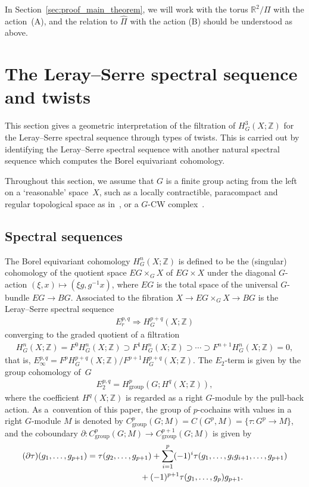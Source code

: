 \documentclass[pdftex]{sigma}
\theoremstyle{definition}
\newcommand{\R}{\mathbb{R}}
\newcommand{\Z}{\mathbb{Z}}
\begin{document}
In Section~\ref{sec:proof_main_theorem}, we will work with the torus $\R^2/\Pi$ with the action~(A), and the relation to $\hat{\Pi}$ with the action (B) should be understood as above.

\section{The Leray--Serre spectral sequence and twists}\label{sec:spectral_seq_and_twist}

This section gives a geometric interpretation of the f\/iltration of $H^3_G(X; \Z)$ for the Leray--Serre spectral sequence through types of twists. This is carried out by identifying the Leray--Serre spectral sequence with another natural spectral sequence which computes the Borel equivariant cohomology.

Throughout this section, we assume that $G$ is a f\/inite group acting from the left on a `reasonable' space~$X$, such as a locally contractible, paracompact and regular topological space as in~\cite{FHT}, or a $G$-CW complex~\cite{May}.

\subsection{Spectral sequences}

The Borel equivariant cohomology $H^n_G(X; \Z)$ is def\/ined to be the (singular) cohomology of the quotient space $EG \times_G X$ of $EG \times X$ under the diagonal $G$-action $(\xi, x) \mapsto (\xi g, g^{-1}x)$, where $EG$ is the total space of the universal $G$-bundle $EG \to BG$. Associated to the f\/ibration $X \to EG \times_G X \to BG$ is the Leray--Serre spectral sequence
\begin{gather*}
E_r^{p, q} \Longrightarrow H^{p+q}_G(X; \Z)
\end{gather*}
converging to the graded quotient of a f\/iltration
\begin{gather*}
H^n_G(X; \Z) = F^0H^n_G(X; \Z) \supset F^1H^n_G(X; \Z) \supset \cdots \supset F^{n+1}H^n_G(X; \Z) = 0,
\end{gather*}
that is, $E_\infty^{p, q} = F^pH^{p+q}_G(X; \Z)/F^{p+1}H^{p+q}_G(X; \Z)$. The $E_2$-term is given by the group cohomology of~$G$
\begin{gather*}
E_2^{p, q} = H^p_{\mathrm{group}}(G; H^q(X; \Z)),
\end{gather*}
where the coef\/f\/icient $H^q(X; \Z)$ is regarded as a right $G$-module by the pull-back action. As a~convention of this paper, the group of $p$-cochains with values in a right $G$-module $M$ is denoted by $C^p_{\mathrm{group}}(G; M) = C(G^p, M) = \{ \tau \colon G^p \to M \}$, and the coboundary $\partial \colon C^p_{\mathrm{group}}(G; M) \to C^{p+1}_{\mathrm{group}}(G; M)$ is given by
\begin{gather*}
(\partial \tau)(g_1, \ldots, g_{p+1})= \tau(g_2, \ldots, g_{p+1})+ \sum_{i = 1}^p (-1)^i \tau(g_1, \ldots, g_ig_{i+1}, \ldots, g_{p+1}) \\
\hphantom{(\partial \tau)(g_1, \ldots, g_{p+1})=}{}+ (-1)^{p+1} \tau(g_1, \ldots, g_p)g_{p+1}.
\end{gather*}
\end{document}
